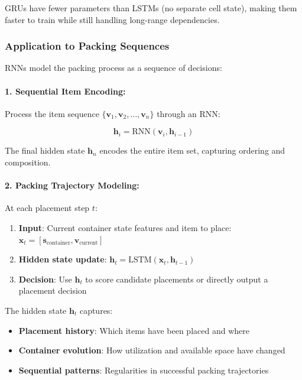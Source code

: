 GRUs have fewer parameters than LSTMs (no separate cell state), making them faster to train while still handling long-range dependencies.

\subsubsection{Application to Packing Sequences}

RNNs model the packing process as a sequence of decisions:

\paragraph{1. Sequential Item Encoding:}

Process the item sequence $\{\mathbf{v}_1, \mathbf{v}_2, \ldots, \mathbf{v}_n\}$ through an RNN:

\begin{equation}
\mathbf{h}_i = \text{RNN}(\mathbf{v}_i, \mathbf{h}_{i-1})
\end{equation}

The final hidden state $\mathbf{h}_n$ encodes the entire item set, capturing ordering and composition.

\paragraph{2. Packing Trajectory Modeling:}

At each placement step $t$:
\begin{enumerate}
\item \textbf{Input}: Current container state features and item to place: $\mathbf{x}_t = [\mathbf{s}_{\text{container}}, \mathbf{v}_{\text{current}}]$
\item \textbf{Hidden state update}: $\mathbf{h}_t = \text{LSTM}(\mathbf{x}_t, \mathbf{h}_{t-1})$
\item \textbf{Decision}: Use $\mathbf{h}_t$ to score candidate placements or directly output a placement decision
\end{enumerate}

The hidden state $\mathbf{h}_t$ captures:
\begin{itemize}
\item \textbf{Placement history}: Which items have been placed and where
\item \textbf{Container evolution}: How utilization and available space have changed
\item \textbf{Sequential patterns}: Regularities in successful packing trajectories
\end{itemize}

